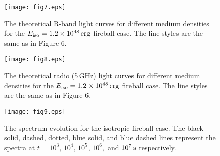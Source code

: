 \documentclass{emulateapj}
\begin{document}
{\begin{figure}
\begin{center}
\texttt{[image: fig7.eps]}
\caption{The theoretical R-band light curves for different medium densities for the $E_{\rm iso}=1.2\times10^{48}\,{\rm erg}$ fireball case. The line styles are the same as in Figure 6.
\label{fig7}}
\end{center}
\end{figure}

\begin{figure}
\begin{center}
\texttt{[image: fig8.eps]}
\caption{The theoretical radio (5\,GHz) light curves for different medium densities for the $E_{\rm iso}=1.2\times10^{48}\,{\rm erg}$ fireball case. The line styles are the same as in Figure 6.
\label{fig8}}
\end{center}
\end{figure}

\begin{figure}
\begin{center}
\texttt{[image: fig9.eps]}
\caption{The spectrum evolution for the isotropic fireball case. The black solid, dashed, dotted, blue solid, and blue dashed lines represent the spectra at $t=10^3,\,10^4,\,10^5,\,10^6,$ and $10^7\,\rm s$ respectively.
\label{fig9}}
\end{center}
\end{figure}

}
\end{document}
